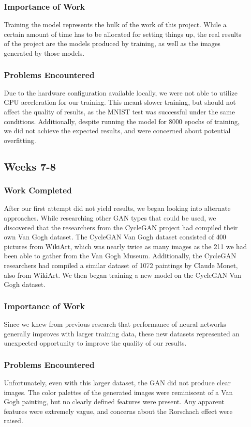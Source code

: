 \documentclass[12pt,letterpaper]{article}
\begin{document}
	\subsubsection{Importance of Work}
	Training the model represents the bulk of the work of this project.
	While a certain amount of time has to be allocated for setting things up, the real results of the project are the models produced by training, as well as the images generated by those models.
	\subsubsection{Problems Encountered}
	Due to the hardware configuration available locally, we were not able to utilize GPU acceleration for our training.
	This meant slower training, but should not affect the quality of results, as the MNIST test was successful under the same conditions.
	Additionally, despite running the model for 8000 epochs of training, we did not achieve the expected results, and were concerned about potential overfitting.

	\subsection{Weeks 7-8}
	\subsubsection{Work Completed}
	After our first attempt did not yield results, we began looking into alternate approaches.
	While researching other GAN types that could be used, we discovered that the researchers from the CycleGAN\cite{CycleGAN2017}\cite{isola2017image} project had compiled their own Van Gogh dataset.
	The CycleGAN Van Gogh dataset consisted of 400 pictures from WikiArt\cite{wikiartVanGogh}, which was nearly twice as many images as the 211 we had been able to gather from the Van Gogh Museum.
	Additionally, the CycleGAN researchers had compiled a similar dataset of 1072 paintings by Claude Monet, also from WikiArt.
	We then began training a new model on the CycleGAN Van Gogh dataset.
	\subsubsection{Importance of Work}
	Since we knew from previous research that performance of neural networks generally improves with larger training data, these new datasets represented an unexpected opportunity to improve the quality of our results.
	\subsubsection{Problems Encountered}
	Unfortunately, even with this larger dataset, the GAN did not produce clear images.
	The color palettes of the generated images were reminiscent of a Van Gogh painting, but no clearly defined features were present.
	Any apparent features were extremely vague, and concerns about the Rorschach effect were raised.
\end{document}
